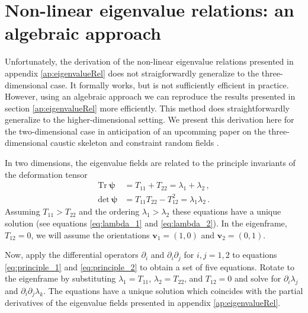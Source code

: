 \documentclass[a4paper, 11pt]{article}
\begin{document}
\section{Non-linear eigenvalue relations: an algebraic approach}\label{ap:eigenvalueRel_alt}
Unfortunately, the derivation of the non-linear eigenvalue relations presented in appendix \ref{ap:eigenvalueRel} does not straigforwardly generalize to the three-dimensional case. It formally works, but is not sufficiently efficient in practice. However, using an algebraic approach we can reproduce the results presented in section \ref{ap:eigenvalueRel} more efficiently. This method does straightforwardly generalize to the higher-dimensional setting. We present this derivation here for the two-dimensional case in anticipation of an upcomming paper on the three-dimensional caustic skeleton and constraint random fields \cite{Feldbrugge:2022}.

In two dimensions, the eigenvalue fields are related to the principle invariants of the deformation tensor
\begin{align}
\text{Tr}\ \bm{\psi} &= T_{11} + T_{22} = \lambda_1 + \lambda_2\,,\label{eq:principle_1}\\
\text{det}\ \bm{\psi} &=  T_{11}  T_{22} - T_{12}^2 = \lambda_1 \lambda_2\,.\label{eq:principle_2}
\end{align}
Assuming $T_{11} > T_{22}$ and the ordering $\lambda_1> \lambda_2$ these equations have a unique solution (see equations \eqref{eq:lambda_1} and \eqref{eq:lambda_2}). In the eigenframe, $T_{12}=0$, we will assume the orientations $\bm{v}_1=(1,0)$ and $\bm{v}_2=(0,1)$. 

Now, apply the differential operators $\partial_i$ and $\partial_{i}\partial_j$ for $i,j=1,2$ to equations \eqref{eq:principle_1} and \eqref{eq:principle_2} to obtain a set of five equations. Rotate to the eigenframe by substituting $\lambda_1 = T_{11}$, $\lambda_2=T_{22}$, and $T_{12}=0$ and solve for $\partial_i\lambda_j$ and $\partial_i \partial_j \lambda_k$. The equations have a unique solution which coincides with the partial derivatives of the eigenvalue fields presented in appendix \ref{ap:eigenvalueRel}.
\end{document}
